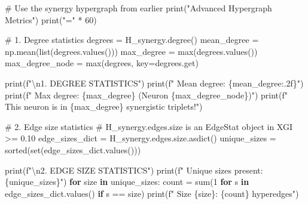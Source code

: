 \documentclass[
  11pt,
  letterpaper,
  oneside,
  openany]{book}
\newenvironment{Shaded}{\begin{snugshade}}{\end{snugshade}}
\newcommand{\BuiltInTok}[1]{\textcolor[rgb]{0.00,0.23,0.31}{#1}}
\newcommand{\CharTok}[1]{\textcolor[rgb]{0.13,0.47,0.30}{#1}}
\newcommand{\CommentTok}[1]{\textcolor[rgb]{0.37,0.37,0.37}{#1}}
\newcommand{\ControlFlowTok}[1]{\textcolor[rgb]{0.00,0.23,0.31}{\textbf{#1}}}
\newcommand{\DecValTok}[1]{\textcolor[rgb]{0.68,0.00,0.00}{#1}}
\newcommand{\KeywordTok}[1]{\textcolor[rgb]{0.00,0.23,0.31}{\textbf{#1}}}
\newcommand{\NormalTok}[1]{\textcolor[rgb]{0.00,0.23,0.31}{#1}}
\newcommand{\OperatorTok}[1]{\textcolor[rgb]{0.37,0.37,0.37}{#1}}
\newcommand{\SpecialCharTok}[1]{\textcolor[rgb]{0.37,0.37,0.37}{#1}}
\newcommand{\SpecialStringTok}[1]{\textcolor[rgb]{0.13,0.47,0.30}{#1}}
\newcommand{\StringTok}[1]{\textcolor[rgb]{0.13,0.47,0.30}{#1}}
\begin{document}
\begin{Shaded}
\begin{Highlighting}[]
\CommentTok{\# Use the synergy hypergraph from earlier}
\BuiltInTok{print}\NormalTok{(}\StringTok{"Advanced Hypergraph Metrics"}\NormalTok{)}
\BuiltInTok{print}\NormalTok{(}\StringTok{"="} \OperatorTok{*} \DecValTok{60}\NormalTok{)}

\CommentTok{\# 1. Degree statistics}
\NormalTok{degrees }\OperatorTok{=}\NormalTok{ H\_synergy.degree()}
\NormalTok{mean\_degree }\OperatorTok{=}\NormalTok{ np.mean(}\BuiltInTok{list}\NormalTok{(degrees.values()))}
\NormalTok{max\_degree }\OperatorTok{=} \BuiltInTok{max}\NormalTok{(degrees.values())}
\NormalTok{max\_degree\_node }\OperatorTok{=} \BuiltInTok{max}\NormalTok{(degrees, key}\OperatorTok{=}\NormalTok{degrees.get)}

\BuiltInTok{print}\NormalTok{(}\SpecialStringTok{f"}\CharTok{\textbackslash{}n}\SpecialStringTok{1. DEGREE STATISTICS"}\NormalTok{)}
\BuiltInTok{print}\NormalTok{(}\SpecialStringTok{f"   Mean degree: }\SpecialCharTok{\{}\NormalTok{mean\_degree}\SpecialCharTok{:.2f\}}\SpecialStringTok{"}\NormalTok{)}
\BuiltInTok{print}\NormalTok{(}\SpecialStringTok{f"   Max degree: }\SpecialCharTok{\{}\NormalTok{max\_degree}\SpecialCharTok{\}}\SpecialStringTok{ (Neuron }\SpecialCharTok{\{}\NormalTok{max\_degree\_node}\SpecialCharTok{\}}\SpecialStringTok{)"}\NormalTok{)}
\BuiltInTok{print}\NormalTok{(}\SpecialStringTok{f"   This neuron is in }\SpecialCharTok{\{}\NormalTok{max\_degree}\SpecialCharTok{\}}\SpecialStringTok{ synergistic triplets!"}\NormalTok{)}

\CommentTok{\# 2. Edge size statistics}
\CommentTok{\# H\_synergy.edges.size is an EdgeStat object in XGI \textgreater{}= 0.10}
\NormalTok{edge\_sizes\_dict }\OperatorTok{=}\NormalTok{ H\_synergy.edges.size.asdict()}
\NormalTok{unique\_sizes }\OperatorTok{=} \BuiltInTok{sorted}\NormalTok{(}\BuiltInTok{set}\NormalTok{(edge\_sizes\_dict.values()))}

\BuiltInTok{print}\NormalTok{(}\SpecialStringTok{f"}\CharTok{\textbackslash{}n}\SpecialStringTok{2. EDGE SIZE STATISTICS"}\NormalTok{)}
\BuiltInTok{print}\NormalTok{(}\SpecialStringTok{f"   Unique sizes present: }\SpecialCharTok{\{}\NormalTok{unique\_sizes}\SpecialCharTok{\}}\SpecialStringTok{"}\NormalTok{)}
\ControlFlowTok{for}\NormalTok{ size }\KeywordTok{in}\NormalTok{ unique\_sizes:}
\NormalTok{    count }\OperatorTok{=} \BuiltInTok{sum}\NormalTok{(}\DecValTok{1} \ControlFlowTok{for}\NormalTok{ s }\KeywordTok{in}\NormalTok{ edge\_sizes\_dict.values() }\ControlFlowTok{if}\NormalTok{ s }\OperatorTok{==}\NormalTok{ size)}
    \BuiltInTok{print}\NormalTok{(}\SpecialStringTok{f"   Size }\SpecialCharTok{\{}\NormalTok{size}\SpecialCharTok{\}}\SpecialStringTok{: }\SpecialCharTok{\{}\NormalTok{count}\SpecialCharTok{\}}\SpecialStringTok{ hyperedges"}\NormalTok{)}


\end{Highlighting}
\end{Shaded}
\end{document}
